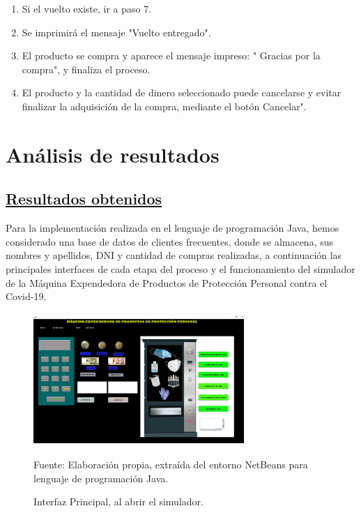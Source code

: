 \documentclass[10pt,conference]{IEEEtran}
\begin{document}
\begin{enumerate}
    \item Si el vuelto existe, ir a paso 7.
    \item Se imprimirá el mensaje "Vuelto entregado".
    \item El producto se compra y aparece el mensaje impreso: " Gracias por la compra", y finaliza el proceso.
    \item El producto y la cantidad de dinero seleccionado puede cancelarse y evitar finalizar la adquisición de la compra, mediante el botón Cancelar".
\end{enumerate}


\section{\textbf{Análisis de resultados}}

\subsection{\underline{\textbf{Resultados obtenidos}}}
Para la implementación realizada en el lenguaje de programación Java, hemos considerado una base de datos de clientes frecuentes, donde se almacena, sus nombres y apellidos, DNI y cantidad de compras realizadas, a continuación las principales interfaces de cada etapa del proceso y el funcionamiento del simulador de la Máquina Expendedora de Productos de Protección Personal contra el Covid-19.

\begin{figure}[H]
    \begin{center}
    \includegraphics[width=8cm, height=5cm]{Resultados/1-Interfaz.JPG}
    \centering
    \caption{Interfaz Principal, al abrir el simulador.}
    \label{1-Interfaz} 
    \vspace{1.5 mm}
    {\small Fuente: Elaboración propia, extraída del entorno NetBeans para lenguaje de programación Java.}
    \end{center}
\end{figure}
\end{document}
